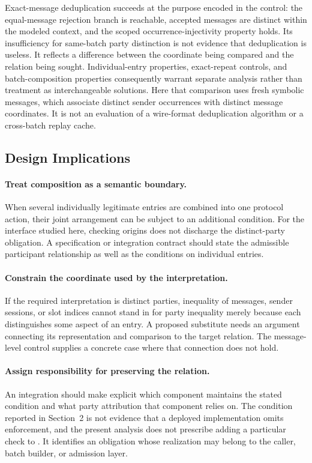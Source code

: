 Exact-message deduplication succeeds at the purpose encoded in the control:
the equal-message rejection branch is reachable, accepted messages are
distinct within the modeled context, and the scoped occurrence-injectivity
property holds. Its insufficiency for same-batch party distinction is not evidence that
deduplication is useless. It reflects a difference between the coordinate
being compared and the relation being sought. Individual-entry properties,
exact-repeat controls, and batch-composition properties consequently warrant
separate analysis rather than treatment as interchangeable solutions. Here
that comparison uses fresh symbolic messages, which associate distinct sender
occurrences with distinct message coordinates. It is not an evaluation of a
wire-format deduplication algorithm or a cross-batch replay cache.

\subsection{Design Implications}

\paragraph{Treat composition as a semantic boundary.}
When several individually legitimate entries are combined into one protocol
action, their joint arrangement can be subject to an additional condition.
For the interface studied here, checking origins does not discharge the
distinct-party obligation. A specification or integration contract should
state the admissible participant relationship as well as the conditions on
individual entries.

\paragraph{Constrain the coordinate used by the interpretation.}
If the required interpretation is distinct parties, inequality of messages,
sender sessions, or slot indices cannot stand in for party inequality merely
because each distinguishes some aspect of an entry. A proposed substitute
needs an argument connecting its representation and comparison to the target
relation. The message-level control supplies a concrete case where that
connection does not hold.

\paragraph{Assign responsibility for preserving the relation.}
An integration should make explicit which component maintains the stated
condition and what party attribution that component relies on. The condition
reported in Section~2 is not evidence that a deployed implementation omits
enforcement, and the present analysis does not prescribe adding a particular
check to \kwaay. It identifies an obligation whose realization may belong to
the caller, batch builder, or admission layer.

